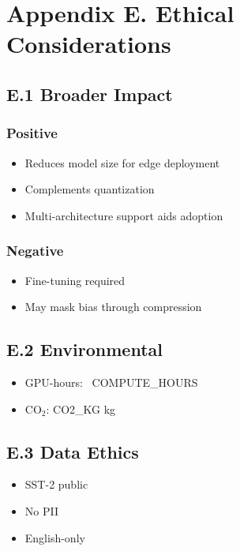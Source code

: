 \section{Appendix E. Ethical Considerations}

\subsection{E.1 Broader Impact}

\subsubsection{Positive}
\begin{itemize}
\item Reduces model size for edge deployment
\item Complements quantization
\item Multi-architecture support aids adoption

\end{itemize}
\subsubsection{Negative}
\begin{itemize}
\item Fine-tuning required
\item May mask bias through compression

\end{itemize}
\subsection{E.2 Environmental}

\begin{itemize}
\item GPU-hours: ~{{COMPUTE\_HOURS}}
\item CO$_2$: {{CO2\_KG}} kg

\end{itemize}
\subsection{E.3 Data Ethics}

\begin{itemize}
\item SST-2 public
\item No PII
\item English-only

\end{itemize}
